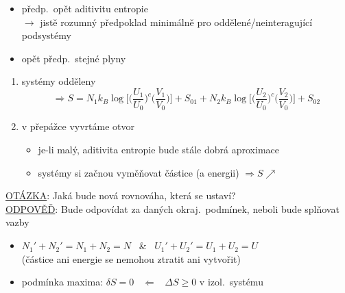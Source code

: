 \begin{priklad}[Př.\ \#2]
\begin{minipage}{0.45\textwidth}
\end{minipage}
\begin{minipage}{0.53\textwidth}
\begin{itemize}[nosep]
  \item předp.\ opět aditivitu entropie \\
  $\to$ jistě rozumný předpoklad minimálně pro oddělené/neinteragující podsystémy
  \item opět předp.\ stejné plyny
\end{itemize}
\end{minipage}

\begin{enumerate}[label=\arabic*)]
  \item systémy odděleny
  \[
    \Rightarrow S = N_1k_B\log\Big[\Big(\frac{U_1}{U_0}\Big)^c\Big(\frac{V_1}{V_0}\Big)\Big] + S_{01}
    + N_2k_B\log\Big[\Big(\frac{U_2}{U_0}\Big)^c\Big(\frac{V_2}{V_0}\Big)\Big] + S_{02}
  \]
  \item v přepážce vyvrtáme otvor
  \begin{itemize}[nosep]
    \item je-li malý, aditivita entropie bude stále dobrá aproximace
    \item systémy si začnou vyměňovat částice (a energii) $\Rightarrow S\nearrow$
  \end{itemize}
\end{enumerate}
\underline{OTÁZKA}: Jaká bude nová rovnováha, která se ustaví? \\
\underline{ODPOVĚĎ}: Bude odpovídat  za daných okraj.\ podmínek, neboli bude splňovat vazby
\begin{itemize}[nosep]
  \item $N_1' + N_2' = N_1 + N_2 = N$ \ \& \ $U_1' + U_2' = U_1 + U_2 = U$ \\
  (částice ani energie se nemohou ztratit ani vytvořit)
  \item podmínka maxima: \quad $\delta S = 0$ \ $\Leftarrow$ \ $\Delta S\geq 0$ v izol.\ systému
\end{itemize}
\end{priklad}

